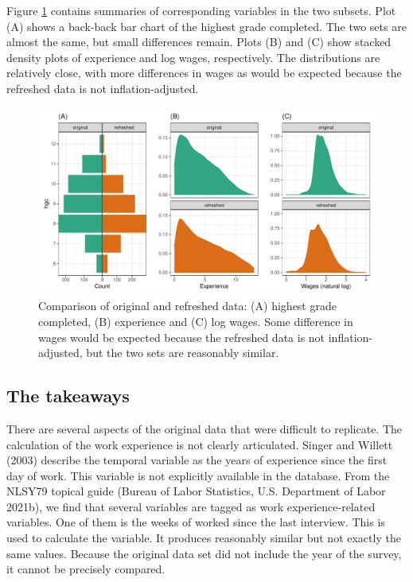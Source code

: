 \documentclass[12pt]{article}
\begin{document}
Figure \ref{fig:compare-subsets} contains summaries of corresponding variables in the two subsets. Plot (A) shows a back-back bar chart of the highest grade completed. The two sets are almost the same, but small differences remain. Plots (B) and (C) show stacked density plots of experience and log wages, respectively. The distributions are relatively close, with more differences in wages as would be expected because the refreshed data is not inflation-adjusted.

\begin{figure}

{\centering \includegraphics[width=1\linewidth]{figures/compare-subsets-1}

}

\caption{Comparison of original and refreshed data: (A) highest grade completed, (B) experience and (C) log wages. Some difference in wages would be expected because the refreshed data is not inflation-adjusted, but the two sets are reasonably similar.}\label{fig:compare-subsets}
\end{figure}

\hypertarget{takeaways}{%
\subsection{The takeaways}\label{takeaways}}

There are several aspects of the original data that were difficult to replicate. The calculation of the work experience is not clearly articulated. Singer and Willett (2003) describe the temporal variable as the years of experience since the first day of work. This variable is not explicitly available in the database. From the NLSY79 topical guide (Bureau of Labor Statistics, U.S. Department of Labor 2021b), we find that several variables are tagged as work experience-related variables. One of them is the weeks of worked since the last interview. This is used to calculate the variable. It produces reasonably similar but not exactly the same values. Because the original data set did not include the year of the survey, it cannot be precisely compared.
\end{document}
